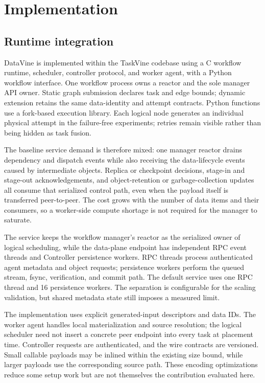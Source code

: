 \section{Implementation}
\subsection{Runtime integration}
DataVine is implemented within the TaskVine codebase using a C workflow
runtime, scheduler, controller protocol, and worker agent, with a Python
workflow interface. One workflow process owns a reactor and the sole manager
API owner. Static graph submission declares task and edge bounds; dynamic
extension retains the same data-identity and attempt contracts. Python
functions use a fork-based execution library. Each logical node generates an
individual physical attempt in the failure-free experiments; retries remain
visible rather than being hidden as task fusion.

The baseline service demand is therefore mixed: one manager reactor drains
dependency and dispatch events while also receiving the data-lifecycle events
caused by intermediate objects. Replica or checkpoint decisions, stage-in and
stage-out acknowledgements, and object-retention or garbage-collection updates
all consume that serialized control path, even when the payload itself is
transferred peer-to-peer. The cost grows with the number of data items and
their consumers, so a worker-side compute shortage is not required for the
manager to saturate.

The service keeps the workflow manager's reactor as the serialized owner of
logical scheduling, while the data-plane endpoint has independent RPC event
threads and Controller persistence workers. RPC threads process authenticated
agent metadata and object requests; persistence workers perform the queued
stream, fsync, verification, and commit path. The default service uses one RPC
thread and 16 persistence workers. The separation is configurable for the
scaling validation, but shared metadata state still imposes a measured limit.

The implementation uses explicit generated-input descriptors and data IDs.
The worker agent handles local materialization and source resolution; the
logical scheduler need not insert a concrete peer endpoint into every task
at placement time. Controller requests are authenticated, and the wire
contracts are versioned. Small callable payloads may be inlined within the
existing size bound, while larger payloads use the corresponding source path.
These encoding optimizations reduce some setup work but are not themselves
the contribution evaluated here.

